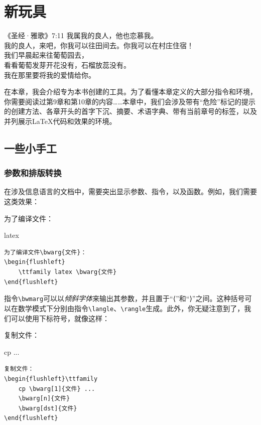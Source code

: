 \chapter{新玩具}

\begin{epigraphe}{《圣经·雅歌》7:11}
    我属我的良人，他也恋慕我。\\我的良人，来吧，你我可以往田间去。你我可以在村庄住宿！\\我们早晨起来往葡萄园去，\\看看葡萄发芽开花没有，石榴放蕊没有。\\我在那里要将我的爱情给你。
\end{epigraphe}

在本章，我会介绍专为本书创建的工具。为了看懂本章定义的大部分指令和环境，你需要阅读过第9章和第10章的内容……本章中，我们会涉及带有“危险”标记的提示的创建方法、各章开头的首字下沉、摘要、术语字典、带有当前章号的标签，以及并列展示\LaTeX 代码和效果的环境。

\section{一些小手工}

\subsection{参数和排版转换}

在涉及信息语言的文档中，需要突出显示参数、指令，以及函数。例如，我们需要这类效果：

\begin{codelist}[11.1]{
    为了编译文件：
\begin{flushleft}
    \ttfamily latex 
\end{flushleft}
}
\begin{verbatim}
为了编译文件\bwarg{文件}：
\begin{flushleft}
    \ttfamily latex \bwarg{文件}
\end{flushleft}\end{verbatim}
\end{codelist}

指令\verb|\bwmarg|可以以\textsl{倾斜字体}来输出其参数，并且置于“⟨”和“⟩”之间。这种括号可以在数学模式下分别由指令\verb|\langle|、\verb|\rangle|生成。此外，你无疑注意到了，我们可以使用下标符号，就像这样：

\begin{codelist}[11.2]{
复制文件：
\begin{flushleft}\ttfamily
    cp  ...
\end{flushleft} 
}
\begin{verbatim}
复制文件：
\begin{flushleft}\ttfamily
    cp \bwarg[1]{文件} ...
    \bwarg[n]{文件}
    \bwarg[dst]{文件}
\end{flushleft}\end{verbatim}
\end{codelist}

